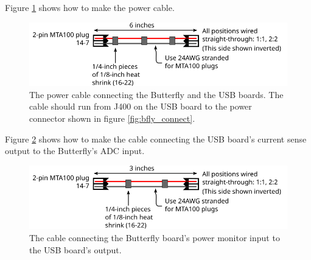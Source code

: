 Figure \ref{fig:bfly_power_cable} shows how to make the power cable.
\begin{figure}[ht]
  \begin{center}
    \includegraphics[clip,scale=1]{figs/butterfly_power_cable}
    \caption{The power cable connecting the Butterfly and the USB
      boards.  The cable should run from J400 on the USB board to the
      power connector shown in figure
      \ref{fig:bfly_connect}.\label{fig:bfly_power_cable} }
  \end{center}
\end{figure}

Figure \ref{fig:isense_cable} shows how to make the cable connecting
the USB board's current sense output to the Butterfly's ADC input.
\begin{figure}[ht]
  \begin{center}
    \includegraphics[clip,scale=1]{figs/current_sense_cable}
    \caption{The cable connecting the Butterfly board's power monitor
      input to the USB board's output.\label{fig:isense_cable} }
  \end{center}
\end{figure}
